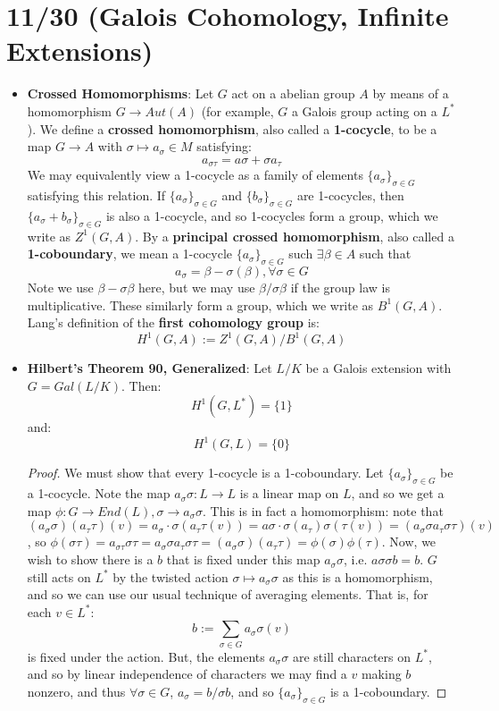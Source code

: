 \documentclass[11pt, oneside]{amsart}   	%
\theoremstyle{definition}
\begin{document}
\section{11/30 (Galois Cohomology, Infinite Extensions)}

\begin{itemize}

	\item \textbf{Crossed Homomorphisms}: Let $G$ act on a abelian group $A$ by means of a homomorphism $G\rightarrow Aut(A)$ (for example, $G$ a 
	Galois group acting on a $L^*$). We define a \textbf{crossed homomorphism}, also called a \textbf{1-cocycle}, to be a map $G\rightarrow A$ with 
	$\sigma\mapsto a_\sigma\in M$ satisfying:
	$$
		a_{\sigma\tau} = a\sigma + \sigma a_\tau
	$$
	We may equivalently view a 1-cocycle as a family of elements $\{a_\sigma\}_{\sigma\in G}$ satisfying this relation. If $\{a_\sigma\}_{\sigma\in G}$ and 
	$\{b_\sigma\}_{\sigma\in G}$ are 1-cocycles, then $\{a_\sigma + b_\sigma\}_{\sigma\in G}$ is also a 1-cocycle, and so 1-cocycles form a group, which 
	we write as $Z^1(G, A)$. By a \textbf{principal crossed homomorphism}, also called a \textbf{1-coboundary}, we mean a 1-cocycle $\{a_\sigma\}
	_{\sigma\in G}$ such $\exists\beta\in A$ such that 
	$$
		a_\sigma = \beta - \sigma(\beta), \forall \sigma\in G
	$$
	Note we use $\beta - \sigma \beta$ here, but we may use $\beta / \sigma\beta$ if the group law is multiplicative. These similarly form a group, which 
	we write as $B^1(G, A)$. Lang's definition of the \textbf{first cohomology group} is:
	$$
		H^1(G, A) := Z^1(G, A) / B^1(G, A)
	$$
	
	\item \textbf{Hilbert's Theorem 90, Generalized}: Let $L / K$ be a Galois extension with $G = Gal(L / K)$. Then:
	$$
		H^1(G, L^*) = \{1\}
	$$
	and:
	$$
		H^1(G, L) = \{0\}
	$$
	
	\begin{proof}
	
		We must show that every 1-cocycle is a 1-coboundary. Let $\{a_\sigma\}_{\sigma\in G}$ be a 1-cocycle. Note the map $a_\sigma\sigma : L
		\rightarrow L$ is a linear map on $L$, and so we get a map $\phi: G\rightarrow End(L), \sigma\rightarrow a_\sigma\sigma$. This is in fact a 
		homomorphism: note that $(a_\sigma\sigma)(a_\tau\tau)(v) = a_\sigma\cdot\sigma(a_\tau\tau(v)) = a\sigma\cdot\sigma(a_\tau)\sigma(\tau(v)) = 
		(a_\sigma\sigma a_\tau\sigma\tau)(v)$, so $\phi(\sigma\tau) = a_{\sigma\tau}\sigma\tau = a_\sigma\sigma a_\tau\sigma\tau = (a_\sigma\sigma)
		(a_\tau\tau) = \phi(\sigma)\phi(\tau)$. Now, we wish to show there is a $b$ that is fixed under this map $a_\sigma\sigma$, i.e. $a\sigma\sigma b = 
		b$. $G$ still acts on $L^*$ by the twisted action $\sigma\mapsto a_\sigma\sigma$ as this is a homomorphism, and so we can use our usual 
		technique of averaging elements. That is, for each $v\in L^*$:
		$$
			b := \sum_{\sigma\in G}a_\sigma\sigma(v)
		$$
		is fixed under the action. But, the elements $a_\sigma\sigma$ are still characters on $L^*$, and so by linear independence of characters we may 
		find a $v$ making $b$ nonzero, and thus $\forall\sigma\in G$, $a_\sigma = b / \sigma b$, and so $\{a_\sigma\}_{\sigma\in G}$ is a 1-coboundary.
	

\end{proof}
\end{itemize}
\end{document}
